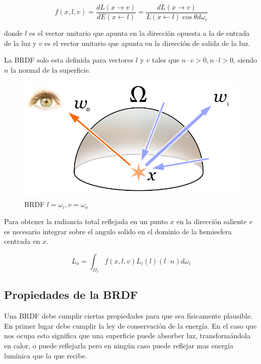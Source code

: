 \begin{equation}
f(x, l, v)=\frac{dL(x \to v)}{dE(x \gets l)} = \frac{dL(x \to v)}{L(x \gets l) \cos\theta d\omega_i} 
\end{equation}

donde $l$ es el vector unitario que apunta en la dirección opuesta a la de entrada de la luz y $v$ es el vector unitario que apunta en la dirección de salida de la luz.

La BRDF solo esta definida para vectores $l$ y $v$ tales que $n \cdot v > 0, n \cdot l > 0$, siendo $n$ la normal de la superficie.

\begin{figure}[h]
\centering
\includegraphics[scale=0.5]{Rendering_eq.png}
\caption{BRDF $l = \omega_i, v = \omega_o$ \cite{Timrb2008}}
\end{figure}


Para obtener la radiancia total reflejada en un punto $x$ en la dirección saliente $v$ es necesario integrar sobre el angulo solido en el dominio de la hemiesfera centrada en $x$.

\begin{equation}
\label{eq:radiance_integral}
L _ o = \int_{\Omega_x} f(x, l, v) L_i(l) (l \cdot n) d\omega_i 
\end{equation}

\clearpage

\subsection{Propiedades de la BRDF}

Una BRDF debe cumplir ciertas propiedades para que sea físicamente plausible.
En primer lugar debe cumplir la ley de conservación de la energía. En el caso que nos ocupa esto significa que una superficie puede absorber luz, transformándola en calor, o puede reflejarla pero en ningún caso puede reflejar mas energía lumínica que la que recibe.

